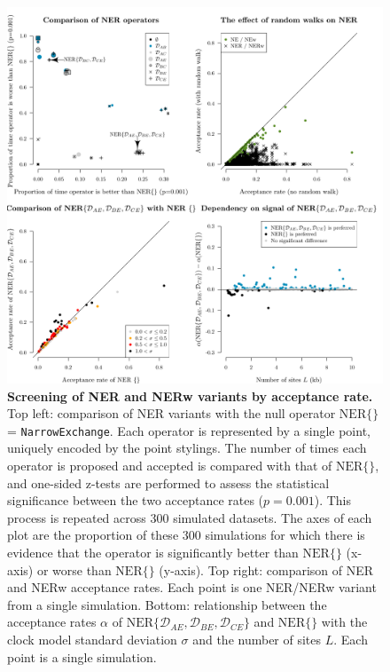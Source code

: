 \documentclass[10pt,letterpaper]{article}
\begin{document}
\begin{figure}[!h]
\includegraphics[width=\textwidth]{Figures/acceptanceRates.pdf}
\caption{\textbf{Screening of NER and NERw variants by acceptance rate.} Top left: comparison of NER variants with the null operator $\text{NER}\{\}$ = \texttt{NarrowExchange}. 
Each operator is represented by a single point, uniquely encoded by the point stylings. 
The number of times each operator is proposed and accepted is compared with that of $\text{NER}\{\}$, and one-sided z-tests are performed to assess the statistical significance between the two acceptance rates ($p = 0.001$).  This process is repeated across $300$ simulated datasets. The axes of each plot are the proportion of these $300$ simulations for which there is evidence that the operator is significantly better than $\text{NER}\{\}$ (x-axis) or worse than $\text{NER}\{\}$ (y-axis). Top right: comparison of NER and NERw acceptance rates. Each point is one NER/NERw variant from a single simulation. Bottom: relationship between the acceptance rates $\alpha$ of $\text{NER}\{\mathcal{D}_{AE}, \mathcal{D}_{BE}, \mathcal{D}_{CE}\}$ and $\text{NER}\{ \}$ with the clock model standard deviation $\sigma$ and the number of sites $L$.  Each point is a single simulation. }
\label{fig:acceptanceRateScreening}
\end{figure}
\end{document}
